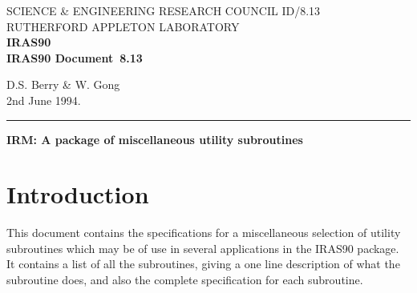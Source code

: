 \pagestyle{myheadings}

\newcommand{\irasdoccategory}  {IRAS90 Document}
\newcommand{\irasdocinitials}  {ID}
\newcommand{\irasdocnumber}    {8.13}
\newcommand{\irasdocauthors}   {D.S. Berry \& W. Gong}
\newcommand{\irasdocdate}      {2nd June 1994.}
\newcommand{\irasdoctitle}     {IRM: A package of miscellaneous utility subroutines}

\newcommand{\irasdocname}{\irasdocinitials /\irasdocnumber}
\renewcommand{\_}{{\tt\char'137}}     %
\markright{\irasdocname}
\setlength{\textwidth}{160mm}
\setlength{\textheight}{240mm}
\setlength{\topmargin}{-5mm}
\setlength{\oddsidemargin}{0mm}
\setlength{\evensidemargin}{0mm}
\setlength{\parindent}{0mm}
\setlength{\parskip}{\medskipamount}
\setlength{\unitlength}{1mm}



\thispagestyle{empty}
SCIENCE \& ENGINEERING RESEARCH COUNCIL \hfill \irasdocname\\
RUTHERFORD APPLETON LABORATORY\\
{\large\bf IRAS90\\}
{\large\bf \irasdoccategory\ \irasdocnumber}
\begin{flushright}
\irasdocauthors\\
\irasdocdate
\end{flushright}
\vspace{-4mm}
\rule{\textwidth}{0.5mm}
\vspace{5mm}
\begin{center}
{\Large\bf \irasdoctitle}
\end{center}
\vspace{5mm}

\setlength{\parskip}{0mm}
\tableofcontents
\setlength{\parskip}{\medskipamount}
\markright{\irasdocname}

\section {Introduction}
This document contains the specifications for a miscellaneous selection of
utility subroutines which may be of use in several applications in the IRAS90 
package. It contains a list of all the subroutines, giving a one line 
description of what the subroutine does, and also the complete specification 
for each subroutine.


